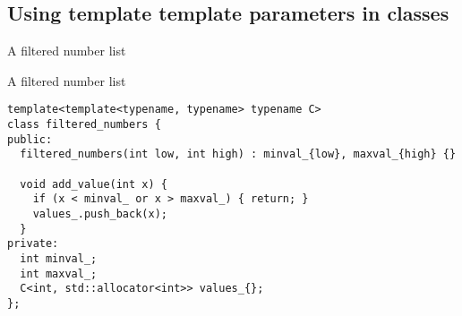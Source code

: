 \subsection{Using template template parameters in classes}

\begin{frame}[t,fragile]{A filtered number list}
\begin{block}{A filtered number list}
\begin{lstlisting}
template<template<typename, typename> typename C>
class filtered_numbers {
public:
  filtered_numbers(int low, int high) : minval_{low}, maxval_{high} {}

  void add_value(int x) {
    if (x < minval_ or x > maxval_) { return; }
    values_.push_back(x);
  }
private:
  int minval_;
  int maxval_;
  C<int, std::allocator<int>> values_{};
};
\end{lstlisting}
\end{block}
\end{frame}

